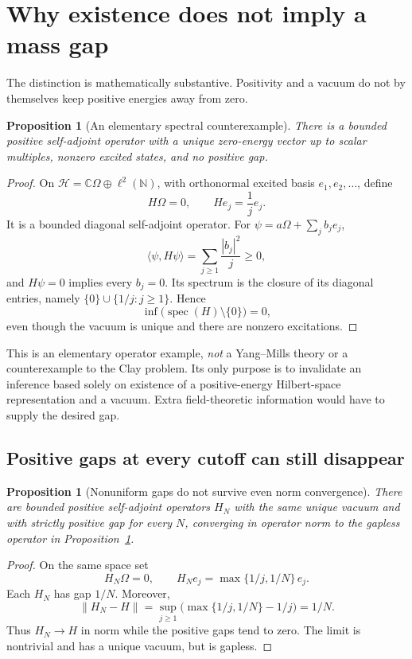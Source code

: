 \documentclass[11pt,a4paper]{article}
\numberwithin{equation}{section}
\newtheorem{proposition}[theorem]{Proposition}
\theoremstyle{definition}
\theoremstyle{remark}
\newcommand{\C}{\mathbb C}
\newcommand{\N}{\mathbb N}
\newcommand{\spec}{\operatorname{spec}}
\begin{document}
\section{Why existence does not imply a mass gap}
The distinction is mathematically substantive. Positivity and a vacuum do not
by themselves keep positive energies away from zero.

\begin{proposition}[An elementary spectral counterexample]\label{prop:gapless}
There is a bounded positive self-adjoint operator with a unique zero-energy
vector up to scalar multiples, nonzero excited states, and no positive gap.
\end{proposition}
\begin{proof}
On $\mathcal H=\C\Omega\oplus\ell^2(\N)$, with orthonormal excited basis
$e_1,e_2,\ldots$, define
\[
 H\Omega=0,\qquad He_j=\frac1j e_j.
\]
It is a bounded diagonal self-adjoint operator. For
$\psi=a\Omega+\sum_j b_je_j$,
\[
 \langle\psi,H\psi\rangle=\sum_{j\ge1}\frac{|b_j|^2}{j}\ge0,
\]
and $H\psi=0$ implies every $b_j=0$. Its spectrum is the closure of its
diagonal entries, namely $\{0\}\cup\{1/j:j\ge1\}$. Hence
\[
 \inf\bigl(\spec(H)\setminus\{0\}\bigr)=0,
\]
even though the vacuum is unique and there are nonzero excitations.
\end{proof}

This is an elementary operator example, \emph{not} a Yang--Mills theory or a
counterexample to the Clay problem. Its only purpose is to invalidate an
inference based solely on existence of a positive-energy Hilbert-space
representation and a vacuum. Extra field-theoretic information would have to
supply the desired gap.

\subsection{Positive gaps at every cutoff can still disappear}
\begin{proposition}[Nonuniform gaps do not survive even norm convergence]
There are bounded positive self-adjoint operators $H_N$ with the same unique
vacuum and with strictly positive gap for every $N$, converging in operator
norm to the gapless operator in Proposition~\ref{prop:gapless}.
\end{proposition}
\begin{proof}
On the same space set
\[
 H_N\Omega=0,\qquad H_Ne_j=\max\{1/j,1/N\}\,e_j.
\]
Each $H_N$ has gap $1/N$. Moreover,
\[
 \|H_N-H\|=\sup_{j\ge1}\bigl(\max\{1/j,1/N\}-1/j\bigr)=1/N.
\]
Thus $H_N\to H$ in norm while the positive gaps tend to zero. The limit is
nontrivial and has a unique vacuum, but is gapless.
\end{proof}
\end{document}
